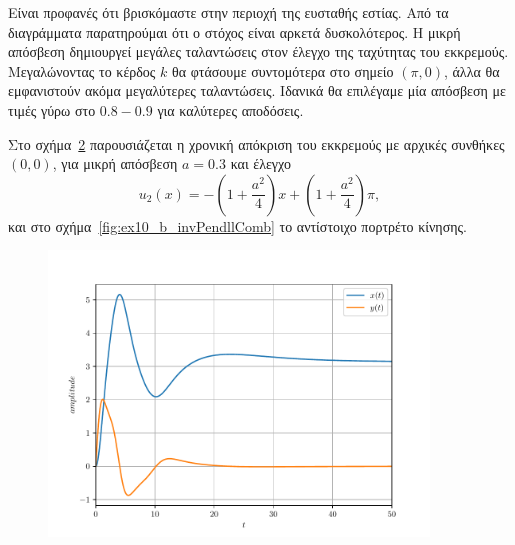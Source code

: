 \begin{solution}
\begin{figure}[h]
        \caption{}
        \label{fig:ex10_b_invPend4Comb}
    \end{figure}
    Είναι προφανές ότι βρισκόμαστε στην περιοχή της ευσταθής εστίας. Από τα
    διαγράμματα παρατηρούμαι ότι ο στόχος είναι αρκετά δυσκολότερος. Η μικρή
    απόσβεση δημιουργεί μεγάλες ταλαντώσεις στον έλεγχο της ταχύτητας του
    εκκρεμούς. Μεγαλώνοντας το κέρδος \( k \) θα φτάσουμε συντομότερα στο σημείο
    \( (\pi, 0) \), άλλα θα εμφανιστούν ακόμα μεγαλύτερες ταλαντώσεις. Ιδανικά
    θα επιλέγαμε μία απόσβεση με τιμές γύρω στο \( 0.8 - 0.9 \) για καλύτερες
    αποδόσεις.

    Στο σχήμα~\ref{fig:ex10_b_invPendll} παρουσιάζεται η χρονική απόκριση του
    εκκρεμούς με αρχικές συνθήκες \( (0, 0) \), για μικρή απόσβεση \( a = 0.3 \)
    και έλεγχο
    \[
        u_2(x) = -\left(1 + \frac{a^2}{4}\right)x +
        \left(1 + \frac{a^2}{4}\right)\pi,
    \]
    και στο σχήμα~\ref{fig:ex10_b_invPendllComb} το αντίστοιχο πορτρέτο κίνησης.
    \begin{figure}[h]
        \centering
        \includegraphics[width=0.9\textwidth]{figures/ex10_b_invPendll.pdf}
        \caption{}
        \label{fig:ex10_b_invPendll}
    \end{figure}
    \begin{figure}[h]
        \centering

\end{figure}
\end{solution}
